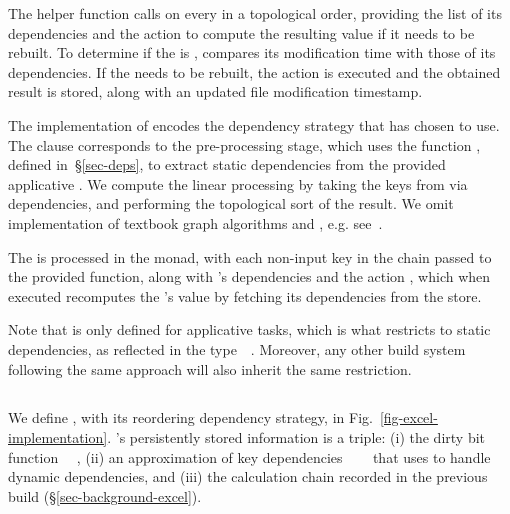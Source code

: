 The helper function  calls  on every  in
a topological order, providing the list of its dependencies  and the
action  to compute the resulting value if it needs to be rebuilt. To
determine if the  is ,  compares its modification
time with those of its dependencies. If the  needs to be rebuilt, the
action  is executed and the obtained result is stored, along with an
updated file modification timestamp.

The implementation of  encodes the dependency strategy that
\Make has chosen to use. The  clause corresponds to the pre-processing
stage, which uses the function , defined in~\S\ref{sec-deps},
to extract static dependencies from the provided applicative . We
compute the linear processing  by taking the keys 
from  via dependencies, and performing the topological sort of the
result. We omit implementation of textbook graph algorithms
 and , e.g.
see~\cite{cormen2001introduction}.

The  is processed in the  monad, with each non-input key
 in the chain passed to the provided  function, along with
's dependencies and the action , which when executed recomputes
the 's value by fetching its dependencies from the store.

Note that  is only defined for applicative tasks, which is what
restricts \Make to static dependencies, as reflected in the
type~~. Moreover, any other build system following
the same  approach will also inherit the same restriction.

\subsection{\Excel}\label{sec-implementation-excel}

We define \Excel, with its reordering dependency strategy, in  Fig.~\ref{fig-excel-implementation}.
\Excel's persistently stored information is a triple: (i) the dirty bit
function ~\hs{->}~, (ii) an approximation of key dependencies
~\hs{->}~~ that \Excel uses to handle
dynamic dependencies, and (iii) the calculation chain \hs{[@@k]} recorded in the
previous build (\S\ref{sec-background-excel}).

